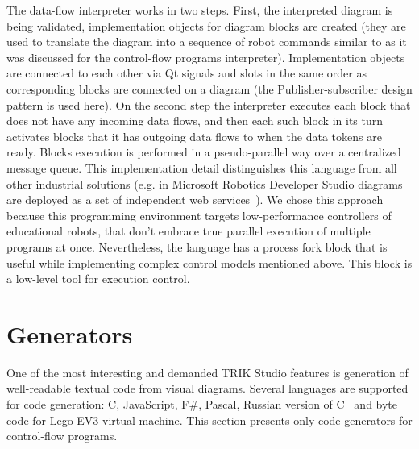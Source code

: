 \documentclass[conference]{IEEEtran}
\begin{document}
The data-flow interpreter works in two steps. First, the interpreted diagram is being validated, implementation objects for diagram blocks are created (they are used to translate the diagram into a sequence of robot commands similar to as it was discussed for the control-flow programs interpreter). Implementation objects are connected to each other via Qt signals and slots in the same order as corresponding blocks are connected on a diagram (the Publisher-subscriber design pattern is used here). On the second step the interpreter executes each block that does not have any incoming data flows, and then each such block in its turn activates blocks that it has outgoing data flows to when the data tokens are ready. Blocks execution is performed in a pseudo-parallel way over a centralized message queue. This implementation detail distinguishes this language from all other industrial solutions (e.g. in Microsoft Robotics Developer Studio diagrams are deployed as a set of independent web services~\cite{jackson2007microsoft}). We chose this approach because this programming environment targets low-performance controllers of educational robots, that don't embrace true parallel execution of multiple programs at once. Nevertheless, the language has a process fork block that is useful while implementing complex control models mentioned above. This block is a low-level tool for execution control.

\section{Generators}
\label{chapter:generators}

One of the most interesting and demanded TRIK Studio features is generation of well-readable textual code from visual diagrams. Several languages are supported for code generation: C, JavaScript, F\#, Pascal, Russian version of C~\cite{terekhovTools} and byte code for Lego EV3 virtual machine. This section presents only code generators for control-flow programs.
\end{document}
